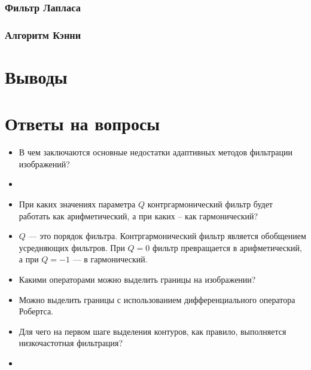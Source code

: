 \subsubsection{Фильтр Лапласа}
\subsubsection{Алгоритм Кэнни}
\section{Выводы}

\section{Ответы на вопросы}

\setcounter{question}{0}

\newcommand{\question}[1]{\item[Q\refstepcounter{question}\thequestion.] #1}
\newcommand{\answer}[1]{\item[A\thequestion.] #1}

\begin{itemize}

\question{В чем заключаются основные недостатки адаптивных методов фильтрации изображений?}
\answer{}

\question{При каких значениях параметра $Q$ контргармонический фильтр будет работать как арифметический, а при каких -- как гармонический?}
\answer{$Q$ — это порядок фильтра. Контргармонический фильтр является обобщением усредняющих фильтров. При $Q = 0$ фильтр превращается в арифметический, а при $Q = -1$ — в гармонический.}

\question{Какими операторами можно выделить границы на изображении?}
\answer{Можно выделить границы с использованием дифференциального оператора
Робертса.}

\question{Для чего на первом шаге выделения контуров, как правило, выполняется низкочастотная фильтрация?}
\answer{}

\end{itemize}
